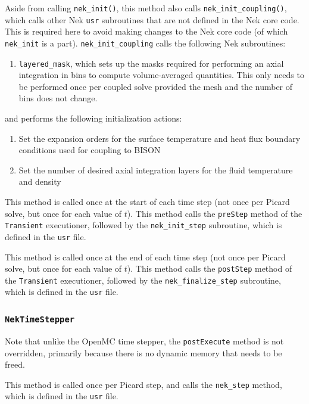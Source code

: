 \documentclass[10pt]{article}
\newcounter{subsubsubsection}[subsubsection]
\numberwithin{equation}{section} %
\begin{document}
Aside from calling {\tt nek\_init()}, this method also calls {\tt nek\_init\_coupling()}, which calls other Nek {\tt usr} subroutines that are not defined in the Nek core code. This is required here to avoid making changes to the Nek core code (of which {\tt nek\_init} is a part). {\tt nek\_init\_coupling} calls the following Nek subroutines:

\begin{enumerate}
\item {\tt layered\_mask}, which sets up the masks required for performing an axial integration in bins to compute volume-averaged quantities. This only needs to be performed once per coupled solve provided the mesh and the number of bins does not change.
\end{enumerate}

and performs the following initialization actions:

\begin{enumerate}
\item Set the expansion orders for the surface temperature and heat flux boundary conditions used for coupling to BISON
\item Set the number of desired axial integration layers for the fluid temperature and density
\end{enumerate}

This method is called once at the start of each time step (not once per Picard solve, but once for each value of \(t\)). This method calls the {\tt preStep} method of the {\tt Transient} executioner, followed by the {\tt nek\_init\_step} subroutine, which is defined in the {\tt usr} file.

This method is called once at the end of each time step (not once per Picard solve, but once for each value of \(t\)). This method calls the {\tt postStep} method of the {\tt Transient} executioner, followed by the {\tt nek\_finalize\_step} subroutine, which is defined in the {\tt usr} file.

\subsubsection{{\tt NekTimeStepper}}
Note that unlike the OpenMC time stepper, the {\tt postExecute} method is not overridden, primarily because there is no dynamic memory that needs to be freed.

This method is called once per Picard step, and calls the {\tt nek\_step} method, which is defined in the {\tt usr} file.
\end{document}
